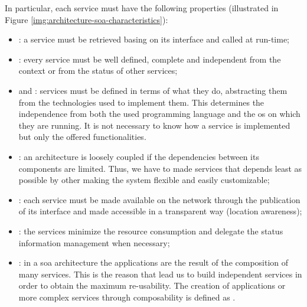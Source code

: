 In particular, each service must have the following properties (illustrated in Figure 
\ref{img:architecture-soa-characteristics}):

\begin{itemize}
	\item{: a service must be retrieved basing on its interface and
		called at run-time;}
	\item{: every service must be well defined, complete and independent
		from the context or from the status of other services;}
	\item{ and : services must
		be defined in terms of what they do, abstracting them from the technologies used to implement
		them. This determines the independence from both the used programming language and the \acs{os}
		on which they are running. It is not necessary to know how a service is implemented but only
		the offered functionalities.}
	\item{: an architecture is loosely coupled if the dependencies
		between its components are limited. Thus, we have to made services that depends least as possible
		by other making the system flexible and easily customizable;}
	\item{: each service must be made available on the network through
		the publication of its interface and made accessible in a transparent way (location awareness);}
	\item{: the services minimize the resource consumption and delegate
		the status information management when necessary;}
	\item{: in a \ac{soa} architecture the applications are the result of
		the composition of many services. This is the reason that lead us to build independent services
		in order to obtain the maximum re-usability. The creation of applications or more complex
		services through composability is defined as .}
\end{itemize}

